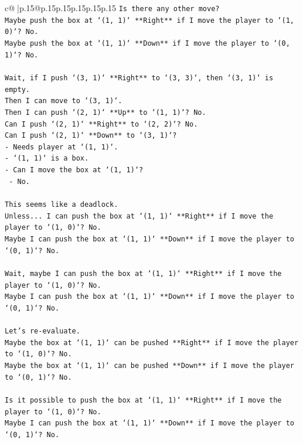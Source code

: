 \documentclass{article}
\begin{document}
{\begin{supertabular}{c@{$\;$}|p{.15\linewidth}@{}p{.15\linewidth}p{.15\linewidth}p{.15\linewidth}p{.15\linewidth}p{.15\linewidth}}
{{{\texttt{Is there any other move?} \\
\texttt{Maybe push the box at `(1, 1)` **Right** if I move the player to `(1, 0)`? No.} \\
\texttt{Maybe push the box at `(1, 1)` **Down** if I move the player to `(0, 1)`? No.} \\
\\ 
\texttt{Wait, if I push `(3, 1)` **Right** to `(3, 3)`, then `(3, 1)` is empty.} \\
\texttt{Then I can move to `(3, 1)`.} \\
\texttt{Then I can push `(2, 1)` **Up** to `(1, 1)`? No.} \\
\texttt{Can I push `(2, 1)` **Right** to `(2, 2)`? No.} \\
\texttt{Can I push `(2, 1)` **Down** to `(3, 1)`?} \\
\texttt{{-} Needs player at `(1, 1)`.} \\
\texttt{{-} `(1, 1)` is a box.} \\
\texttt{{-} Can I move the box at `(1, 1)`?} \\
\texttt{  {-} No.} \\
\\ 
\texttt{This seems like a deadlock.} \\
\texttt{Unless... I can push the box at `(1, 1)` **Right** if I move the player to `(1, 0)`? No.} \\
\texttt{Maybe I can push the box at `(1, 1)` **Down** if I move the player to `(0, 1)`? No.} \\
\\ 
\texttt{Wait, maybe I can push the box at `(1, 1)` **Right** if I move the player to `(1, 0)`? No.} \\
\texttt{Maybe I can push the box at `(1, 1)` **Down** if I move the player to `(0, 1)`? No.} \\
\\ 
\texttt{Let's re{-}evaluate.} \\
\texttt{Maybe the box at `(1, 1)` can be pushed **Right** if I move the player to `(1, 0)`? No.} \\
\texttt{Maybe the box at `(1, 1)` can be pushed **Down** if I move the player to `(0, 1)`? No.} \\
\\ 
\texttt{Is it possible to push the box at `(1, 1)` **Right** if I move the player to `(1, 0)`? No.} \\
\texttt{Maybe I can push the box at `(1, 1)` **Down** if I move the player to `(0, 1)`? No.} \\
}}}
\end{supertabular}}
\end{document}
